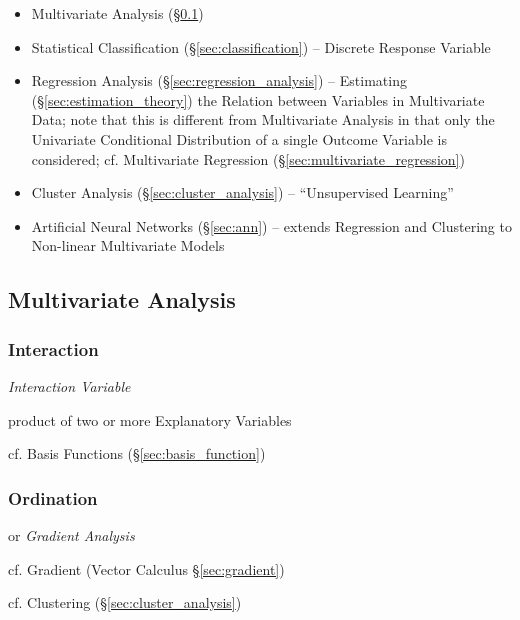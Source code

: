 \begin{itemize}
  \item Multivariate Analysis (\S\ref{sec:multivariate_analysis})
  \item Statistical Classification (\S\ref{sec:classification})
    -- Discrete Response Variable
  \item Regression Analysis (\S\ref{sec:regression_analysis}) -- Estimating
    (\S\ref{sec:estimation_theory}) the Relation between Variables in
    Multivariate Data; note that this is different from Multivariate Analysis in
    that only the Univariate Conditional Distribution of a single Outcome
    Variable is considered; cf. Multivariate Regression
    (\S\ref{sec:multivariate_regression})
  \item Cluster Analysis (\S\ref{sec:cluster_analysis}) --
    ``Unsupervised Learning''
  \item Artificial Neural Networks (\S\ref{sec:ann}) -- extends Regression and
    Clustering to Non-linear Multivariate Models
\end{itemize}



\subsection{Multivariate Analysis}\label{sec:multivariate_analysis}

\subsubsection{Interaction}\label{sec:interaction}

\emph{Interaction Variable}

product of two or more Explanatory Variables

cf. Basis Functions (\S\ref{sec:basis_function})



\subsubsection{Ordination}\label{sec:ordination}

or \emph{Gradient Analysis}

cf. Gradient (Vector Calculus \S\ref{sec:gradient})

cf. Clustering (\S\ref{sec:cluster_analysis})



